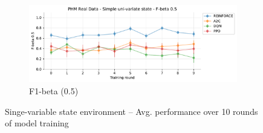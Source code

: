 \documentclass[a4paper, 12pt]{article}
\begin{document}
\begin{figure}[ht]
	\begin{subfigure}{\textwidth}
		\centering
		\includegraphics[width=\linewidth]{Singevariable_F05.pdf}  
		\caption{F1-beta (0.5)}
		\label{fig:tr-ss-f05}
	\end{subfigure}
	\caption{Singe-variable state environment -- Avg. performance over 10 rounds of model training}
	\label{fig:tr-ss-env}
\end{figure}
\end{document}
